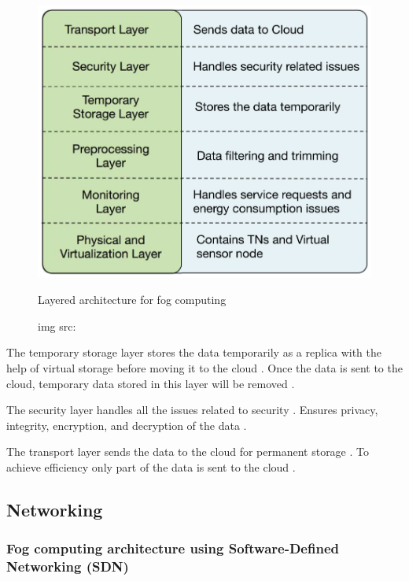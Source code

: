 \begin{figure}[H]
    \centering
    \includegraphics[width=.5\linewidth]{image/Layered architecture for fog computing.png}
    \caption{Layered architecture for fog computing}
    \caption*{img src: \cite{mukherjee2018survey}}
    \label{fig:layered architecture for fog computing}
\end{figure}

The temporary storage layer stores the data temporarily \cite{mukherjee2018survey} as a replica with the help of virtual storage before moving it to the cloud \cite{webpage}. Once the data is sent to the cloud, temporary data stored in this layer will be removed \cite{webpage}. \par

The security layer handles all the issues related to security \cite{mukherjee2018survey}. Ensures privacy, integrity, encryption, and decryption of the data \cite{webpage}. \par

The transport layer sends the data to the cloud \cite{mukherjee2018survey} for permanent storage \cite{webpage}. To achieve efficiency only part of the data is sent to the cloud \cite{webpage}.


\subsection{Networking}


\subsubsection{Fog computing architecture using Software-Defined Networking (SDN)}

